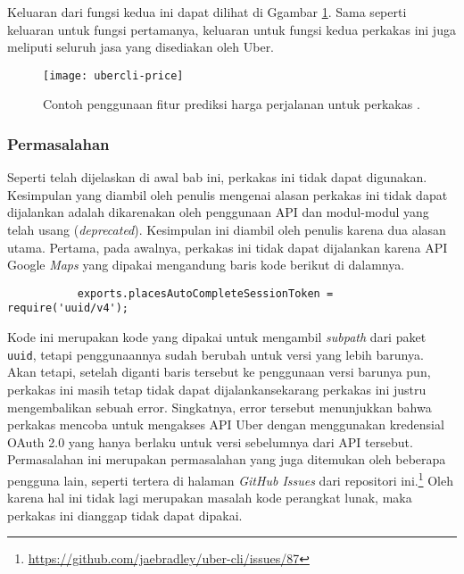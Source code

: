 Keluaran dari fungsi kedua ini dapat dilihat di Ggambar \ref{fig:similarapps-ubercli-price}. Sama seperti keluaran untuk fungsi pertamanya, keluaran untuk fungsi kedua perkakas ini juga meliputi seluruh jasa yang disediakan oleh Uber.
\vspace*{1em} %
\begin{figure}[ht]
    \centering
    \texttt{[image: ubercli-price]}
    \caption[Contoh penggunaan perkakas \ubercli\xspace (\textit{price})]{Contoh penggunaan fitur prediksi harga perjalanan untuk perkakas \ubercli\protect\footnotemark.}
    \label{fig:similarapps-ubercli-price}
\end{figure}

\subsubsection{Permasalahan}
\label{sec:similarapps-ubercli-problem}

Seperti telah dijelaskan di awal bab ini, perkakas ini tidak dapat digunakan. Kesimpulan yang diambil oleh penulis mengenai alasan perkakas ini tidak dapat dijalankan adalah dikarenakan oleh penggunaan API dan modul-modul yang telah usang (\textit{deprecated}). Kesimpulan ini diambil oleh penulis karena dua alasan utama. Pertama, pada awalnya, perkakas ini tidak dapat dijalankan karena API Google \textit{Maps} yang dipakai mengandung baris kode berikut di dalamnya.
\vspace{0.5em} %
\begin{verbatim}
           exports.placesAutoCompleteSessionToken = require('uuid/v4');
\end{verbatim}
\newpage %
Kode ini merupakan kode yang dipakai untuk mengambil \textit{subpath} dari paket \verb|uuid|, tetapi penggunaannya sudah berubah untuk versi yang lebih barunya. Akan tetapi, setelah diganti baris tersebut ke penggunaan versi barunya pun, perkakas ini masih tetap tidak dapat dijalankan\textemdash sekarang perkakas ini justru mengembalikan sebuah error. Singkatnya, error tersebut menunjukkan bahwa perkakas mencoba untuk mengakses API Uber dengan menggunakan kredensial OAuth 2.0 yang hanya berlaku untuk versi sebelumnya dari API tersebut. Permasalahan ini merupakan permasalahan yang juga ditemukan oleh beberapa pengguna lain, seperti tertera di halaman \textit{GitHub Issues} dari repositori ini.\footnote{\href{https://github.com/jaebradley/uber-cli/issues/87}{https://github.com/jaebradley/uber-cli/issues/87}} Oleh karena hal ini tidak lagi merupakan masalah kode perangkat lunak, maka perkakas ini dianggap tidak dapat dipakai.

